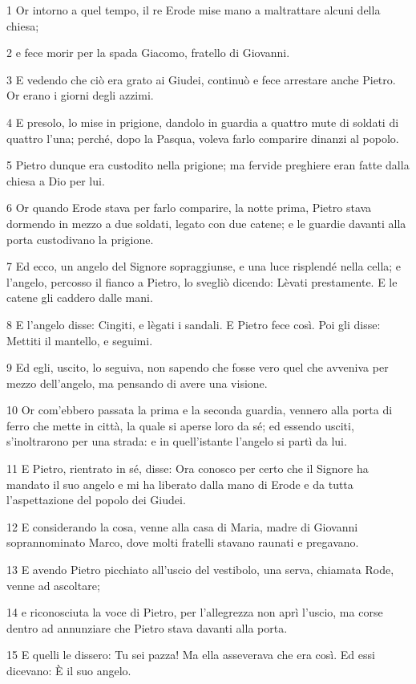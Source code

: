 \par 1 Or intorno a quel tempo, il re Erode mise mano a maltrattare alcuni della chiesa;
\par 2 e fece morir per la spada Giacomo, fratello di Giovanni.
\par 3 E vedendo che ciò era grato ai Giudei, continuò e fece arrestare anche Pietro. Or erano i giorni degli azzimi.
\par 4 E presolo, lo mise in prigione, dandolo in guardia a quattro mute di soldati di quattro l'una; perché, dopo la Pasqua, voleva farlo comparire dinanzi al popolo.
\par 5 Pietro dunque era custodito nella prigione; ma fervide preghiere eran fatte dalla chiesa a Dio per lui.
\par 6 Or quando Erode stava per farlo comparire, la notte prima, Pietro stava dormendo in mezzo a due soldati, legato con due catene; e le guardie davanti alla porta custodivano la prigione.
\par 7 Ed ecco, un angelo del Signore sopraggiunse, e una luce risplendé nella cella; e l'angelo, percosso il fianco a Pietro, lo svegliò dicendo: Lèvati prestamente. E le catene gli caddero dalle mani.
\par 8 E l'angelo disse: Cingiti, e lègati i sandali. E Pietro fece così. Poi gli disse: Mettiti il mantello, e seguimi.
\par 9 Ed egli, uscito, lo seguiva, non sapendo che fosse vero quel che avveniva per mezzo dell'angelo, ma pensando di avere una visione.
\par 10 Or com'ebbero passata la prima e la seconda guardia, vennero alla porta di ferro che mette in città, la quale si aperse loro da sé; ed essendo usciti, s'inoltrarono per una strada: e in quell'istante l'angelo si partì da lui.
\par 11 E Pietro, rientrato in sé, disse: Ora conosco per certo che il Signore ha mandato il suo angelo e mi ha liberato dalla mano di Erode e da tutta l'aspettazione del popolo dei Giudei.
\par 12 E considerando la cosa, venne alla casa di Maria, madre di Giovanni soprannominato Marco, dove molti fratelli stavano raunati e pregavano.
\par 13 E avendo Pietro picchiato all'uscio del vestibolo, una serva, chiamata Rode, venne ad ascoltare;
\par 14 e riconosciuta la voce di Pietro, per l'allegrezza non aprì l'uscio, ma corse dentro ad annunziare che Pietro stava davanti alla porta.
\par 15 E quelli le dissero: Tu sei pazza! Ma ella asseverava che era così. Ed essi dicevano: È il suo angelo.
